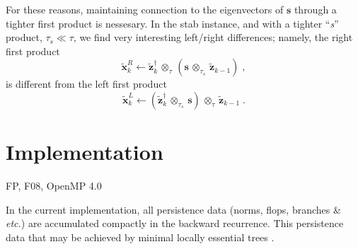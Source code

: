 \documentclass[letterpaper,twocolumn,amsmath,amsfont,amssymb,english,aps,jcp,preprintnumbers,groupaddress,nofootinbib,tightenlines]{revtex4}
\newcommand{\mat}[1]{\boldsymbol{#1}}
\newcommand{\ot}{ {\scriptstyle \otimes}_{ \tau } }
\newcommand{\ots}{ {\scriptstyle \otimes}_{ \tau_s } }
\begin{document}
For these reasons, maintaining connection to the eigenvectors of $\mat{s}$ through 
a tighter first product is nessesary.  In the stab instance, and with a 
tighter ``{\em s}'' product, $\tau_s \ll \tau$, we find very interesting left/right differences; 
namely, the right first product 
\begin{equation} 
\widetilde{\mat{x}}^R_k \leftarrow \widetilde{\mat{z}}^\dagger_{k} \, \ot  \, \left( \mat{s} \,  \ots \, \widetilde{\mat{z}}_{k-1}  \right) \; ,
\end{equation}
is  different from the left first product 
\begin{equation} 
\widetilde{\mat{x}}^L_k \leftarrow \left(  \widetilde{\mat{z}}^\dagger_{k} \, \ots \, \mat{s} \right) \,  \ot  \, \widetilde{\mat{z}}_{k-1} \; .
\end{equation}



\section{Implementation}
FP, F08, OpenMP 4.0

In the current implementation, all persistence data
(norms, flops, branches \& {\em etc.}) are accumulated compactly in the backward recurrence.  This persistence data
 that may be achieved by minimal locally essential trees \cite{}.
\end{document}
